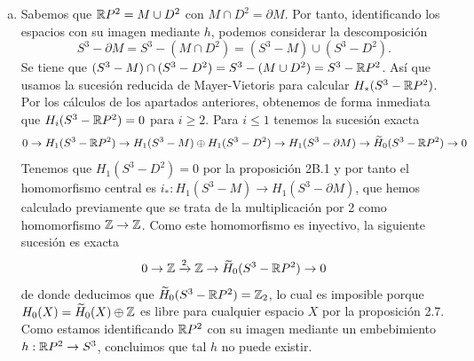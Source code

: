\documentclass[twoside]{article}
\begin{document}
\begin{solucion}
\begin{enumerate}[(a)]
\item Sabemos que $\mathbb{R} P^2 = M\cup D^2$ con $M\cap D^2=\partial M$. Por tanto, identificando los espacios con su imagen mediante $h$, podemos considerar la descomposición $$S^3-\partial M=S^3-(M\cap D^2)=(S^3-M)\cup (S^3-D^2).$$ Se tiene que $(S^3-M)\cap (S^3-D^2)=S^3-(M\cup D^2)=S^3-\mathbb{R} P^2$. Así que usamos la sucesión reducida de Mayer-Vietoris para calcular $H_*(S^3-\mathbb{R} P^2)$. Por los cálculos de los apartados anteriores, obtenemos de forma inmediata que $H_i(S^3-\mathbb{R} P^2)=0$ para $i\geq 2$. Para $i\leq 1$ tenemos la sucesión exacta 
\[
0\to H_1(S^3-\mathbb{R} P^2)\to H_1(S^3-M)\oplus H_1(S^3-D^2)\to H_1(S^3-\partial M)\to \widetilde{H}_0(S^3-\mathbb{R} P^2)\to 0
\]
Tenemos que $H_1(S^3-D^2)=0$ por la proposición 2B.1 y por tanto el homomorfismo central es $i_*:H_1(S^3-M)\to H_1(S^3-\partial M)$, que hemos calculado previamente que se trata de la multiplicación por 2 como homomorfismo $\mathbb{Z}\to\mathbb{Z}$. Como este homomorfismo es inyectivo, la siguiente sucesión es exacta
\[
0\to \mathbb{Z}\xrightarrow{2} \mathbb{Z}\to \widetilde{H}_0(S^3-\mathbb{R} P^2)\to 0
\]
de donde deducimos que $\widetilde{H}_0(S^3-\mathbb{R} P^2)=\mathbb{Z}_2$, lo cual es imposible porque $H_0(X)=\widetilde{H}_0(X)\oplus\mathbb{Z}$ es libre para cualquier espacio $X$ por la proposición 2.7. Como estamos identificando $\mathbb{R} P^2$ con su imagen mediante un embebimiento $h:\mathbb{R} P^2\to S^3$, concluimos que tal $h$ no puede existir. 


\end{enumerate}


\end{solucion}
\end{document}

